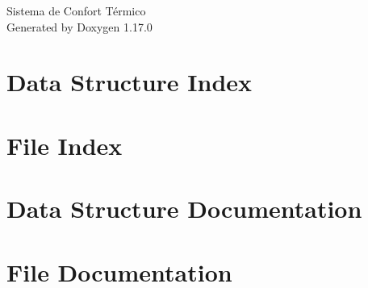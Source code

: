\documentclass[twoside]{book}
\newcommand{\+}{\discretionary{\mbox{\scriptsize$\hookleftarrow$}}{}{}}
\newcommand{\clearemptydoublepage}{%
    \newpage{\pagestyle{empty}\cleardoublepage}%
  }
\begin{document}
  \raggedbottom
    \hypersetup{pageanchor=false,
                bookmarksnumbered=true,
                pdfencoding=unicode
               }
  \begin{titlepage}
  \vspace*{7cm}
  \begin{center}%
  {\Large Sistema de Confort Térmico}\\
  \vspace*{1cm}
  {\large Generated by Doxygen 1.17.0}\\
  \end{center}
  \end{titlepage}
  \clearemptydoublepage
  \tableofcontents
  \clearemptydoublepage
  \hypersetup{pageanchor=true}
\chapter{Data Structure Index}

\chapter{File Index}

\chapter{Data Structure Documentation}

\chapter{File Documentation}












  \backmatter
  \newpage
  \clearemptydoublepage
  \printindex
\end{document}
